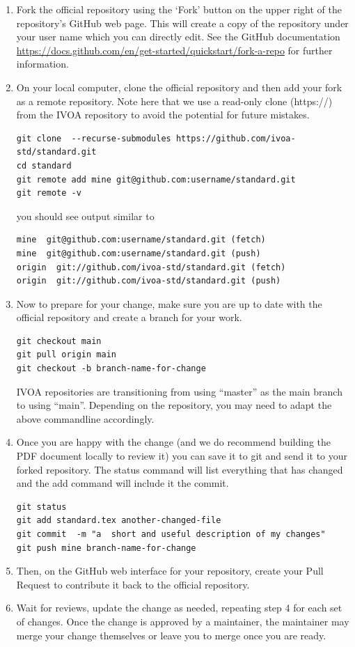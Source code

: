 \documentclass[11pt,a4paper]{ivoa}
\begin{document}
\begin{enumerate}

\item Fork the official repository using the `Fork' button on the upper
right of the repository's GitHub web page. This will create a copy of 
the repository under your user name which you can directly edit. See the
GitHub documentation 
\url{https://docs.github.com/en/get-started/quickstart/fork-a-repo} for 
further information.

\item On your local computer, clone the official repository and 
then add your fork as a remote repository. Note here that we use a 
read-only clone (https://) from the IVOA repository to avoid the potential
for future mistakes. 
\begin{lstlisting}
git clone  --recurse-submodules https://github.com/ivoa-std/standard.git
cd standard
git remote add mine git@github.com:username/standard.git
git remote -v
\end{lstlisting}

you should see output similar to 
\begin{lstlisting}
mine  git@github.com:username/standard.git (fetch)
mine  git@github.com:username/standard.git (push)
origin  git://github.com/ivoa-std/standard.git (fetch)
origin  git://github.com/ivoa-std/standard.git (push)
\end{lstlisting}


\item Now to prepare for your change, make sure you are up to date with
the official repository and create a branch for your work.
\begin{lstlisting}
git checkout main
git pull origin main
git checkout -b branch-name-for-change
\end{lstlisting}

IVOA repositories are transitioning from using ``master'' as the main
branch to using ``main''.  Depending on the repository, you may need to
adapt the above commandline accordingly.

\item Once you are happy with the change (and we do recommend building
the PDF document locally to review it) you can save it to git and send 
it to your forked repository.  The status command will list everything 
that has changed and the add command will include it the commit.

\begin{lstlisting}
git status
git add standard.tex another-changed-file
git commit  -m "a  short and useful description of my changes"
git push mine branch-name-for-change
\end{lstlisting}

\item  Then, on the GitHub web interface for your repository, create
your Pull Request to contribute it back to the official repository.

\item  Wait for reviews, update the change as needed, repeating step 4
for each set of changes. Once the change is approved by a maintainer,
the maintainer may merge your change themselves or leave you to merge
once you are ready.
\end{enumerate}
\end{document}
